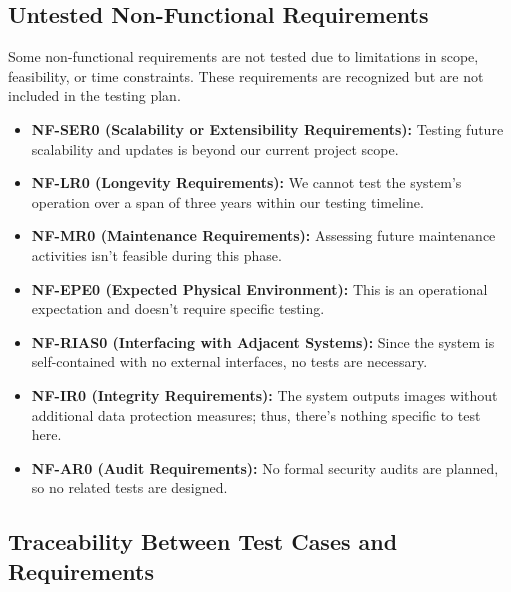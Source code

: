 \documentclass[12pt, titlepage]{article}
\begin{document}
\subsection{Untested Non-Functional Requirements}
Some non-functional requirements are not tested due to limitations in scope, feasibility, or time
constraints. These requirements are recognized but are not included in the testing plan.
\begin{itemize}
  \item \textbf{NF-SER0 (Scalability or Extensibility Requirements):} Testing future scalability and updates is beyond our current project scope.
  \item \textbf{NF-LR0 (Longevity Requirements):} We cannot test the system's operation over a span of three years within our testing timeline.
  \item \textbf{NF-MR0 (Maintenance Requirements):} Assessing future maintenance activities isn't feasible during this phase.
  \item \textbf{NF-EPE0 (Expected Physical Environment):} This is an operational expectation and doesn't require specific testing.
  \item \textbf{NF-RIAS0 (Interfacing with Adjacent Systems):} Since the system is self-contained with no external interfaces, no tests are necessary.
  \item \textbf{NF-IR0 (Integrity Requirements):} The system outputs images without additional data protection measures; thus, there's nothing specific to test here.
  \item \textbf{NF-AR0 (Audit Requirements):} No formal security audits are planned, so no related tests are designed.
\end{itemize}

\subsection{Traceability Between Test Cases and Requirements}
\end{document}
